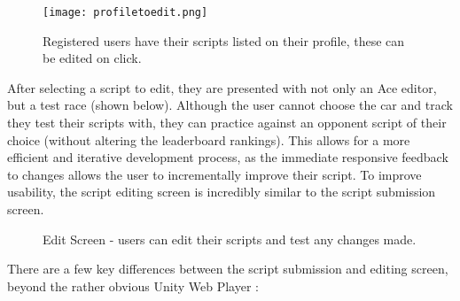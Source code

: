\begin{figure}[H]
\centering
\texttt{[image: profiletoedit.png]}
\caption{Registered users have their scripts listed on their profile, these can be edited on click.}
\end{figure}

After selecting a script to edit, they are presented with not only an Ace editor, but a test race (shown below). Although the user cannot choose the car and track they test their scripts with, they can practice against an opponent script of their choice (without altering the leaderboard rankings). This allows for a more efficient and iterative development process, as the immediate responsive feedback to changes allows the user to incrementally improve their script. To improve usability, the script editing screen is incredibly similar to the script submission screen. 

\begin{figure}[h]
\caption{Edit Screen - users can edit their scripts and test any changes made.}
\end{figure}

There are a few key differences between the script submission and editing screen, beyond the rather obvious Unity Web Player :

